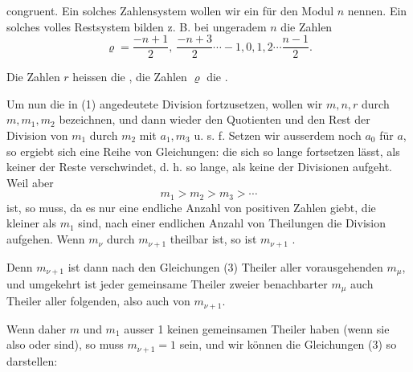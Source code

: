 
congruent. Ein solches Zahlensystem wollen wir ein  für den Modul $n$ nennen. Ein solches volles Restsystem bilden z. B. bei ungeradem $n$ die Zahlen
\[
\varrho = \frac{-n+1}{2}, \ \frac{-n+3}{2} \cdots -1, 0, 1, 2 \cdots \frac{n-1}{2}.
\]

Die Zahlen $r$ heissen die , die Zahlen $\varrho$ die .

Um nun die in (1) angedeutete Division fortzusetzen, wollen wir $m, n, r$ durch $m, m_1, m_2$ bezeichnen, und dann wieder den Quotienten und den Rest der Division von $m_1$ durch $m_2$ mit $a_1, m_3$ u. s. f. Setzen wir ausserdem noch $a_0$ für $a$, so ergiebt sich eine Reihe von Gleichungen:
die sich so lange fortsetzen lässt, als keiner der Reste verschwindet, d. h. so lange, als keine der Divisionen aufgeht. Weil aber
\[
m_1 > m_2 > m_3 > \cdots
\]
ist, so muss, da es nur eine endliche Anzahl von positiven Zahlen giebt, die kleiner als $m_1$ sind, nach einer endlichen Anzahl von Theilungen die Division aufgehen. Wenn $m_\nu$ durch $m_{\nu+1}$ theilbar ist, so ist $m_{\nu+1}$ .

Denn $m_{\nu+1}$ ist dann nach den Gleichungen (3) Theiler aller vorausgehenden $m_\mu$, und umgekehrt ist jeder gemeinsame Theiler zweier benachbarter $m_\mu$ auch Theiler aller folgenden, also auch von $m_{\nu+1}$.

Wenn daher $m$ und $m_1$ ausser 1 keinen gemeinsamen Theiler haben (wenn sie also  oder  sind), so muss $m_{\nu+1} = 1$ sein, und wir können die Gleichungen (3) so darstellen:
